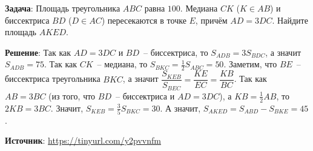 \documentclass{article} %
\begin{document}
\textbf{Задача}: Площадь треугольника $ABC$ равна $100$. Медиана $CK$ ($K \in AB$) и биссектриса $BD$ ($D \in AC$) пересекаются в точке $E$, причём $AD=3DC$. Найдите площадь $AKED$.  

\begin{center}
\end{center}

\textbf{Решение}: Так как $AD=3DC$ и $BD$~-- биссектриса, то $S_{ADB} = 3S_{BDC}$, а значит $S_{ADB} = 75$. Так как $CK$~-- медиана, то $S_{BKC} = \frac{1}{2} S_{ABC} = 50$. Заметим, что $BE$~-- биссектриса треугольника $BKC$, а значит $\dfrac{S_{KEB}}{S_{BEC}} = \dfrac{KE}{EC} = \dfrac{KB}{BC}$. Так как $AB=3BC$ (из того, что $BD$~-- биссектриса и $AD=3DC$), а $KB=\frac{1}{2}AB$, то $2KB=3BC$. Значит, $S_{KEB} = \frac{3}{5} S_{BKC} = 30$. А значит, $S_{AKED} = S_{ABD}-S_{BKE}=45$.

\textbf{Источник}: \url{https://tinyurl.com/y2pvvnfm} 
\end{document}
